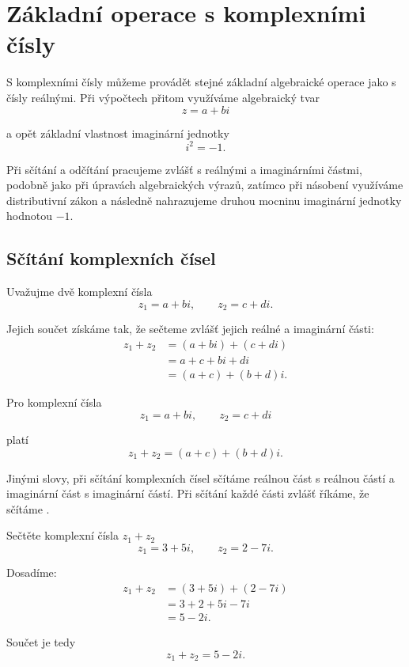 \documentclass[12pt,a4paper]{article}
\begin{document}

\section{Základní operace s komplexními čísly}
S komplexními čísly můžeme provádět stejné základní algebraické operace jako s čísly reálnými.
Při výpočtech přitom využíváme algebraický tvar
\[
    z=a+bi
\]

a opět základní vlastnost imaginární jednotky
\[
    i^2=-1.
\]

Při sčítání a odčítání pracujeme zvlášť s reálnými a imaginárními částmi,
podobně jako při úpravách algebraických výrazů, 
zatímco při násobení využíváme distributivní zákon a
následně nahrazujeme druhou mocninu imaginární jednotky hodnotou $-1$.

\subsection{Sčítání komplexních čísel}
Uvažujme dvě komplexní čísla
\[
    z_1=a+bi, \qquad z_2=c+di.
\]

Jejich součet získáme tak, že sečteme zvlášť jejich reálné a imaginární části:
\begin{align*}
    z_1+z_2 &= (a+bi)+(c+di) \\
            &= a+c+bi+di \\
            &= (a+c)+(b+d)i.
\end{align*}

\begin{definitionbox}
    Pro komplexní čísla
    \[
        z_1=a+bi, \qquad z_2=c+di
    \]

    platí
    \[
        z_1+z_2 = (a+c)+(b+d)i.
    \]
\end{definitionbox}

Jinými slovy, při sčítání komplexních čísel sčítáme reálnou část s reálnou
částí a imaginární část s imaginární částí. Při sčítání každé části zvlášť
říkáme, že sčítáme .

\begin{examplebox}
    Sečtěte komplexní čísla $z_1 + z_2$
    \[
        z_1=3+5i, \qquad z_2=2-7i.
    \]

    Dosadíme:
    \begin{align*}
        z_1+z_2 &= (3 + 5i) + (2 - 7i) \\
                &= 3 + 2 + 5i - 7i \\
                &= 5 - 2i.
    \end{align*}

    Součet je tedy
    \[
        z_1+z_2=5-2i.
    \]

\end{examplebox}
\end{document}
